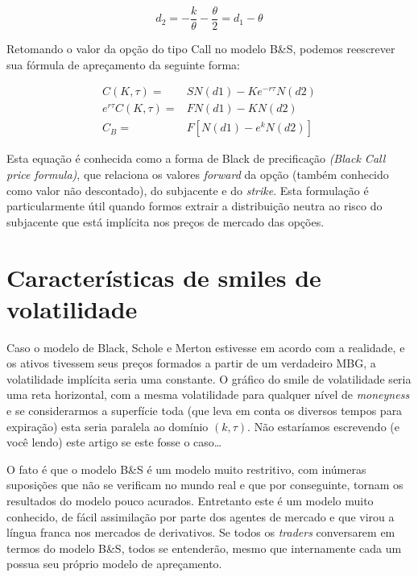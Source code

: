 \documentclass[]{book}
\theoremstyle{definition}
\theoremstyle{definition}
\theoremstyle{definition}
\theoremstyle{remark}
\begin{document}
\begin{equation}
d_{2}={-\frac{k}{\theta}-\frac{\theta}{2}}=d_1-\theta
\label{eq:d2mod}
\end{equation}

Retomando o valor da opção do tipo Call no modelo B\&S, podemos
reescrever sua fórmula de apreçamento da seguinte forma:

\begin{equation}
\begin{aligned}
C(K, \tau)=&SN(d1)-Ke^{-r\tau}N(d2)\\
e^{r\tau}C(K, \tau)=&FN(d1)-KN(d2)\\
C_B=&F\left[N(d1)-e^kN(d2)\right]
\end{aligned}
\label{eq:cblack}
\end{equation}

Esta equação é conhecida como a forma de Black de precificação
\emph{(Black Call price formula)}, que relaciona os valores
\emph{forward} da opção (também conhecido como valor não descontado), do
subjacente e do \emph{strike}. Esta formulação é particularmente útil
quando formos extrair a distribuição neutra ao risco do subjacente que
está implícita nos preços de mercado das opções.

\section{Características de smiles de volatilidade}\label{caracsmile}

Caso o modelo de Black, Schole e Merton estivesse em acordo com a
realidade, e os ativos tivessem seus preços formados a partir de um
verdadeiro MBG, a volatilidade implícita seria uma constante. O gráfico
do smile de volatilidade seria uma reta horizontal, com a mesma
volatilidade para qualquer nível de \emph{moneyness} e se considerarmos
a superfície toda (que leva em conta os diversos tempos para expiração)
esta seria paralela ao domínio \((k, \tau)\). Não estaríamos escrevendo
(e você lendo) este artigo se este fosse o caso\ldots{}

O fato é que o modelo B\&S é um modelo muito restritivo, com inúmeras
suposições que não se verificam no mundo real e que por conseguinte,
tornam os resultados do modelo pouco acurados. Entretanto este é um
modelo muito conhecido, de fácil assimilação por parte dos agentes de
mercado e que virou a língua franca nos mercados de derivativos. Se
todos os \emph{traders} conversarem em termos do modelo B\&S, todos se
entenderão, mesmo que internamente cada um possua seu próprio modelo de
apreçamento.
\end{document}
